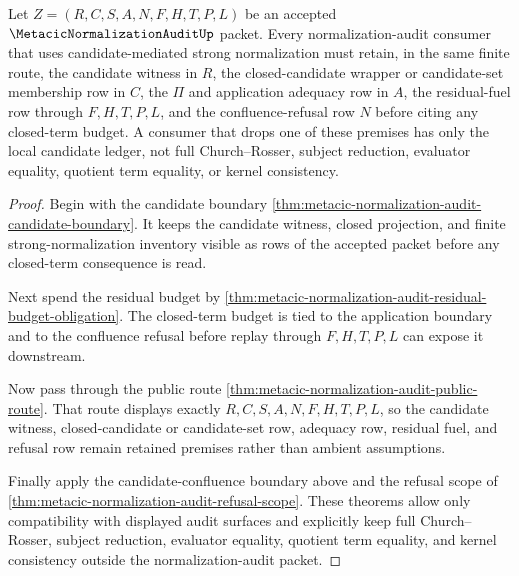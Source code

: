 \begin{theorem}
\label{thm:metacic-normalization-audit-retained-premise-budget}
Let $Z=(R,C,S,A,N,F,H,T,P,L)$ be an accepted
$\MetacicNormalizationAuditUp$ packet. Every normalization-audit consumer that
uses candidate-mediated strong normalization must retain, in the same finite
route, the candidate witness in $R$, the closed-candidate wrapper or
candidate-set membership row in $C$, the $\Pi$ and application adequacy row in
$A$, the residual-fuel row through $F,H,T,P,L$, and the confluence-refusal row
$N$ before citing any closed-term budget. A consumer that drops one of these
premises has only the local candidate ledger, not full Church--Rosser, subject
reduction, evaluator equality, quotient term equality, or kernel consistency.
\end{theorem}
\begin{proof}
Begin with the candidate boundary
\autoref{thm:metacic-normalization-audit-candidate-boundary}. It keeps the
candidate witness, closed projection, and finite strong-normalization inventory
visible as rows of the accepted packet before any closed-term consequence is
read.

Next spend the residual budget by
\autoref{thm:metacic-normalization-audit-residual-budget-obligation}. The
closed-term budget is tied to the application boundary and to the confluence
refusal before replay through $F,H,T,P,L$ can expose it downstream.

Now pass through the public route
\autoref{thm:metacic-normalization-audit-public-route}. That route displays
exactly $R,C,S,A,N,F,H,T,P,L$, so the candidate witness, closed-candidate or
candidate-set row, adequacy row, residual fuel, and refusal row remain retained
premises rather than ambient assumptions.

Finally apply the candidate-confluence boundary above and the refusal scope of
\autoref{thm:metacic-normalization-audit-refusal-scope}. These theorems allow
only compatibility with displayed audit surfaces and explicitly keep full
Church--Rosser, subject reduction, evaluator equality, quotient term equality,
and kernel consistency outside the normalization-audit packet.
\end{proof}

